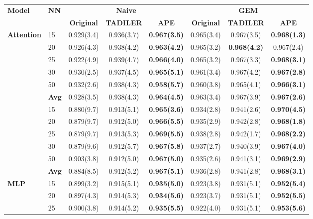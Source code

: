 \documentclass[pdflatex,sn-mathphys-num]{sn-jnl}%
\theoremstyle{thmstyleone}%
\theoremstyle{thmstyletwo}%
\theoremstyle{thmstylethree}%
\begin{document}
\begin{table}
{\begin{tabular}{llcccccc}
  \toprule
  \bfseries Model & \bfseries NN & \multicolumn{3}{c}{\bfseries Naive} & \multicolumn{3}{c}{\bfseries GEM} \\
  \cmidrule(lr){3-5} \cmidrule(lr){6-8}
 &  \bfseries  & \bfseries Original & \bfseries TADILER & \bfseries APE & \bfseries Original & \bfseries TADILER & \bfseries APE \\
  \midrule
\multirow{7}{*}{\textbf{Attention}} & 15 & 0.929(3.4) & 0.936(3.7) & \textbf{0.967(3.5)} & 0.965(3.4) & 0.967(3.5) & \textbf{0.968(1.3)} \\
 & 20 & 0.926(4.3) & 0.938(4.2) & \textbf{0.963(4.2)} & 0.965(3.2) & \textbf{0.968(4.2)} & 0.967(2.4) \\
 & 25 & 0.922(4.9) & 0.939(4.7) & \textbf{0.966(4.0)} & 0.965(3.2) & 0.967(3.3) & \textbf{0.968(3.1)} \\
 & 30 & 0.930(2.5) & 0.937(4.5) & \textbf{0.965(5.1)} & 0.961(3.4) & 0.967(4.2) & \textbf{0.967(2.8)} \\
 & 50 & 0.932(2.6) & 0.938(4.3) & \textbf{0.958(5.7)} & 0.960(3.8) & 0.965(4.1) & \textbf{0.966(3.1)} \\
  \cmidrule(lr){2-8}
 & \textbf{Avg} & 0.928(3.5) & 0.938(4.3) & \textbf{0.964(4.5)} & 0.963(3.4) & 0.967(3.9) & \textbf{0.967(2.6)} \\
  \midrule
\multirow{7}{*}{\textbf{Residual}} & 15 & 0.880(9.7) & 0.913(5.1) & \textbf{0.965(3.6)} & 0.934(2.8) & 0.941(2.6) & \textbf{0.970(4.5)} \\
 & 20 & 0.879(9.7) & 0.912(5.0) & \textbf{0.966(5.5)} & 0.935(2.9) & 0.942(2.8) & \textbf{0.968(1.8)} \\
 & 25 & 0.879(9.7) & 0.913(5.3) & \textbf{0.969(5.5)} & 0.938(2.8) & 0.942(1.7) & \textbf{0.968(2.2)} \\
 & 30 & 0.879(9.6) & 0.912(5.7) & \textbf{0.967(5.8)} & 0.937(2.7) & 0.940(3.9) & \textbf{0.967(4.0)} \\
 & 50 & 0.903(3.8) & 0.912(5.0) & \textbf{0.967(5.0)} & 0.935(2.6) & 0.941(3.1) & \textbf{0.969(2.9)} \\
  \cmidrule(lr){2-8}
 & \textbf{Avg} & 0.884(8.5) & 0.912(5.2) & \textbf{0.967(5.1)} & 0.936(2.8) & 0.941(2.8) & \textbf{0.968(3.1)} \\
  \midrule
\multirow{7}{*}{\textbf{MLP}} & 15 & 0.899(3.2) & 0.915(5.1) & \textbf{0.935(5.0)} & 0.923(3.8) & 0.931(5.1) & \textbf{0.952(5.4)} \\
 & 20 & 0.897(4.3) & 0.914(5.3) & \textbf{0.934(5.6)} & 0.923(3.7) & 0.931(5.1) & \textbf{0.952(5.5)} \\
 & 25 & 0.900(3.8) & 0.914(5.2) & \textbf{0.935(5.5)} & 0.922(4.0) & 0.931(5.1) & \textbf{0.953(5.6)} \\

\end{tabular}}
\end{table}
\end{document}
